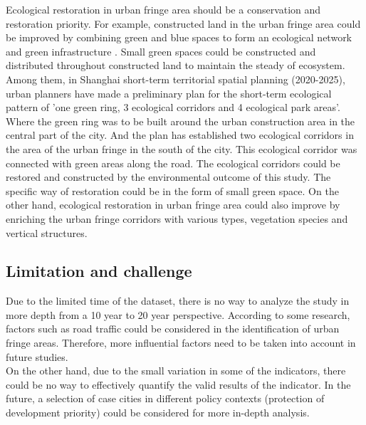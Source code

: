 Ecological restoration in urban fringe area should be a conservation and restoration priority. For example, constructed land in the urban fringe area could be improved by combining green and blue spaces to form an ecological network and green infrastructure \parencite{yu_critical_2020}. Small green spaces could be constructed and distributed throughout constructed land to maintain the steady of ecosystem. Among them, in Shanghai short-term territorial spatial planning (2020-2025), urban planners have made a preliminary plan for the short-term ecological pattern of 'one green ring, 3 ecological corridors and 4 ecological park areas'. Where the green ring was to be built around the urban construction area in the central part of the city. And the plan has established two ecological corridors in the area of the urban fringe in the south of the city. This ecological corridor was connected with green areas along the road. The ecological corridors could be restored and constructed by the environmental outcome of this study. The specific way of restoration could be in the form of small green space. On the other hand, ecological restoration in urban fringe area could also improve by enriching the urban fringe corridors with various types, vegetation species and vertical structures\parencite{yang_construction_2018}.\\


\subsection{Limitation and challenge}
Due to the limited time of the dataset, there is no way to analyze the study in more depth from a 10 year to 20 year perspective. According to some research, factors such as road traffic could be considered in the identification of urban fringe areas. Therefore, more influential factors need to be taken into account in future studies.\\

On the other hand, due to the small variation in some of the indicators, there could be no way to effectively quantify the valid results of the indicator. In the future, a selection of case cities in different policy contexts (protection of development priority) could be considered for more in-depth analysis.\\
